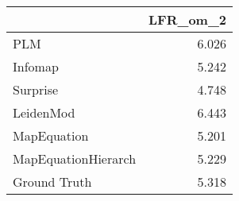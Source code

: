 \begin{tabular}{lr}
\toprule
{} & LFR_om_2 \\
\midrule
PLM                 &    6.026 \\
Infomap             &    5.242 \\
Surprise            &    4.748 \\
LeidenMod           &    6.443 \\
MapEquation         &    5.201 \\
MapEquationHierarch &    5.229 \\
Ground Truth        &    5.318 \\
\bottomrule
\end{tabular}

